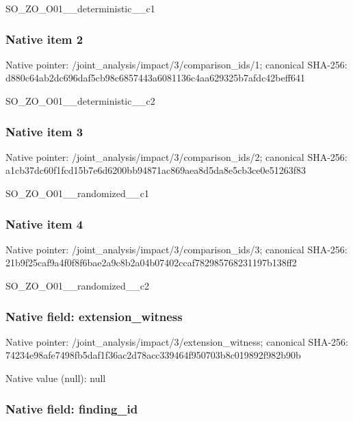 \documentclass[10pt,a4paper]{article}
\begin{document}
SO\_ZO\_O01\_\_deterministic\_\_c1


\subsubsection{Native item 2}


Native pointer: /joint\_analysis/impact/3\allowbreak{}/comparison\_ids/1; canonical SHA-256: d880c64ab2dc696daf5cb98c\allowbreak{}6857443a6081136c4aa62932\allowbreak{}5b7afdc42beff641


SO\_ZO\_O01\_\_deterministic\_\_c2


\subsubsection{Native item 3}


Native pointer: /joint\_analysis/impact/3\allowbreak{}/comparison\_ids/2; canonical SHA-256: a1cb37dc60f1fcd15b7e6d62\allowbreak{}00bb94871ac869aea8d5da8e\allowbreak{}5cb3ce0e51263f83


SO\_ZO\_O01\_\_randomized\_\_c1


\subsubsection{Native item 4}


Native pointer: /joint\_analysis/impact/3\allowbreak{}/comparison\_ids/3; canonical SHA-256: 21b9f25caf9a4f0f8f6bae2a\allowbreak{}9c8b2a04b07402ccaf782985\allowbreak{}768231197b138ff2


SO\_ZO\_O01\_\_randomized\_\_c2


\subsubsection{Native field: extension\_witness}


Native pointer: /joint\_analysis/impact/3\allowbreak{}/extension\_witness; canonical SHA-256: 74234e98afe7498fb5daf1f3\allowbreak{}6ac2d78acc339464f950703b\allowbreak{}8c019892f982b90b



Native value (null): null



\subsubsection{Native field: finding\_id}
\end{document}
